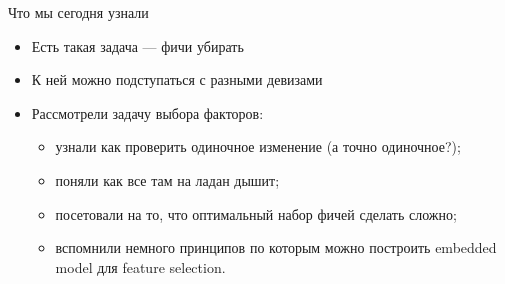 \documentclass[14pt, fleqn, xcolor={dvipsnames, table}]{beamer}
\begin{document}
\begin{frame}{Что мы сегодня узнали}
\begin{itemize}
  \item Есть такая задача --- фичи убирать
  \item К ней можно подступаться с разными девизами
  \item Рассмотрели задачу выбора факторов:
  \begin{itemize}
    \item узнали как проверить одиночное изменение (а точно одиночное?);
    \item поняли как все там на ладан дышит;
    \item посетовали на то, что оптимальный набор фичей сделать сложно;
    \item вспомнили немного принципов по которым можно построить embedded model для feature selection.
  \end{itemize}
\end{itemize}
\end{frame}
\end{document}
